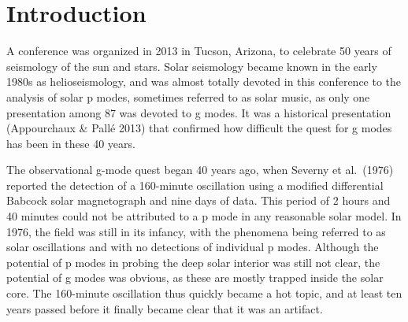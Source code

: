 \documentclass[bibyear]{aa}
\begin{document}
 
 \maketitle


\section{Introduction}

A conference was organized in 2013 in Tucson, Arizona, to celebrate 50 years of seismology of the sun and stars. Solar seismology became known in the early 1980s as helioseismology, and was almost totally devoted in this conference to the analysis of solar p modes, sometimes referred to as solar music, as only one presentation among 87 was devoted to g modes. It  was a historical presentation  (Appourchaux \& Pall\'e 2013) that confirmed how difficult the quest for g modes has been in these 40 years.  

The observational  g-mode quest began 40 years ago, when Severny et al.~(1976) reported the detection of a 160-minute oscillation using a modified differential Babcock solar magnetograph and nine days of data. This period of 2 hours and 40 minutes could not be attributed to a p mode in any reasonable solar model. In 1976, the field was still in its infancy, with the phenomena being referred to as  solar oscillations and with no detections of individual p modes. Although the potential of p modes in probing the deep solar interior was still not clear, the potential of g modes was obvious, as these are mostly trapped inside the solar core. The 160-minute oscillation thus quickly became a hot topic, and at least  ten years passed before it finally became clear that it was an artifact.
\end{document}

